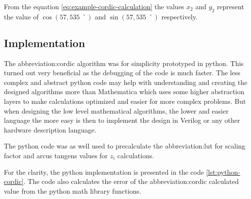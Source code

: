 \documentclass[a4paper, twoside, 11pt]{article}
\begin{document}
            \par
            From the equation \ref{eq:example-cordic-calculation} the values $x_2$ and $y_2$ represent the value of $\cos (57,535\;˚)$ and $\sin (57,535\;˚)$ respectively.

    \subsection{Implementation}\label{subsec:cordic-implementation}
        The \gls{abbreviation:cordic} algorithm was for simplicity prototyped in python. This turned out very beneficial as the debugging of the code is much faster. The less complex and abstract python code may help with understanding and creating the designed algorithms more than Mathematica which uses some higher abstraction layers to make calculations optimized and easier for more complex problems. But when designing the low level mathematical algorithms, the lower and easier language the more easy is then to implement the design in Verilog or any other hardware description language.\par
        The python code was as well used to precalculate the \gls{abbreviation:lut} for scaling factor and arcus tangens values for $z_i$ calculations.\par
        For the clarity, the python implementation is presented in the code \ref{lst:python-cordic}. The code also calculates the error of the \gls{abbreviation:cordic} calculated value from the python math library functions.
\end{document}

